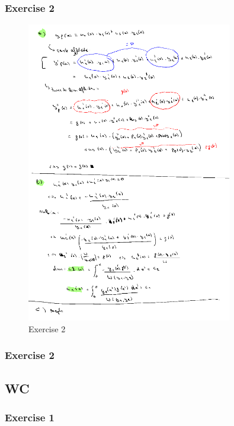 \documentclass[a4paper]{report}
\begin{document}
\subsubsection{Exercise 2}

\begin{figure}[H]
	\centering
	\includegraphics[width=0.8\textwidth]{assets/bord_8_ex_2.png}
	\caption{Exercise 2}
\end{figure}

\subsubsection{Exercise 2}



\subsection{WC}

\subsubsection{Exercise 1}
\end{document}

